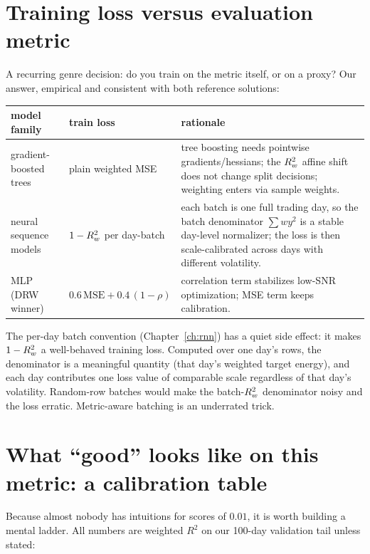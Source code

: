 \section{Training loss versus evaluation metric}

A recurring genre decision: do you train on the metric itself, or on a proxy?
Our answer, empirical and consistent with both reference solutions:

\begin{center}
\begin{tabularx}{\textwidth}{@{}lXX@{}}
\toprule
model family & train loss & rationale \\
\midrule
gradient-boosted trees & plain weighted MSE & tree boosting needs pointwise
gradients/hessians; the $R^2_{w}$ affine shift does not change split decisions;
weighting enters via sample weights. \\
neural sequence models & $1-R^2_{w}$ per day-batch & each batch is one full
trading day, so the batch denominator $\sum w y^2$ is a stable day-level
normalizer; the loss is then scale-calibrated across days with different
volatility. \\
MLP (DRW winner) & $0.6\,\mathrm{MSE} + 0.4\,(1-\rho)$ & correlation term
stabilizes low-SNR optimization; MSE term keeps calibration. \\
\bottomrule
\end{tabularx}
\end{center}

\begin{keybox}[: batch = one day makes the metric trainable]
The per-day batch convention (Chapter~\ref{ch:rnn}) has a quiet side effect:
it makes $1-R^2_{w}$ a well-behaved training loss. Computed over one day's rows,
the denominator is a meaningful quantity (that day's weighted target energy),
and each day contributes one loss value of comparable scale regardless of
that day's volatility. Random-row batches would make the batch-$R^2_{w}$
denominator noisy and the loss erratic. Metric-aware batching is an
underrated trick.
\end{keybox}

\section{What ``good'' looks like on this metric: a calibration table}

Because almost nobody has intuitions for scores of $0.01$, it is worth
building a mental ladder. All numbers are weighted $R^2$ on our 100-day
validation tail unless stated:

